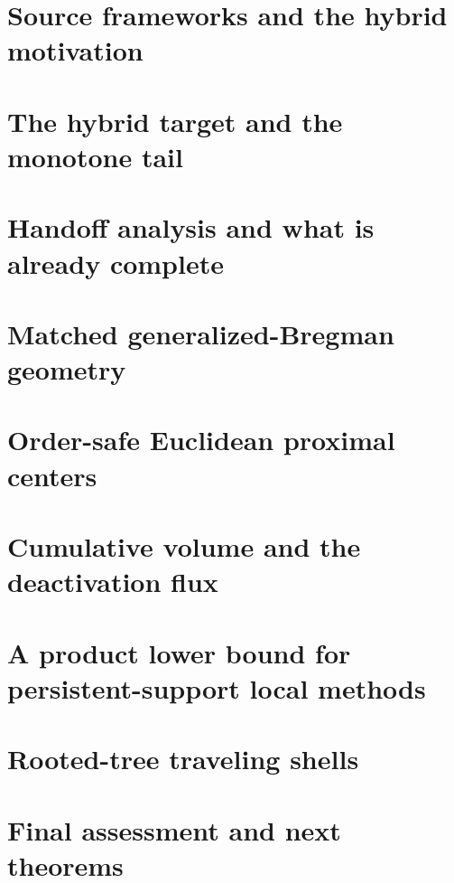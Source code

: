 \documentclass[11pt]{article}
\begin{document}
\section{Source frameworks and the hybrid motivation}


\section{The hybrid target and the monotone tail}


\section{Handoff analysis and what is already complete}


\section{Matched generalized-Bregman geometry}


\section{Order-safe Euclidean proximal centers}


\section{Cumulative volume and the deactivation flux}


\section{A product lower bound for persistent-support local methods}


\section{Rooted-tree traveling shells}


\section{Final assessment and next theorems}




\end{document}

